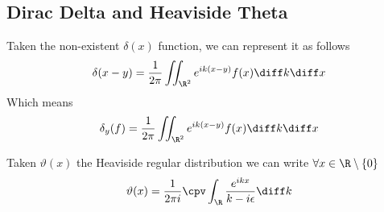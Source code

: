 \documentclass[../mmf.tex]{subfiles}
\begin{document}
\subsection{Dirac Delta and Heaviside Theta}
\begin{thm}
	Taken the non-existent $\delta(x)$ function, we can represent it as follows
	\begin{equation}
		\delta(x-y)=\frac{1}{2\pi}\iint_{\R^2}^{}e^{ik(x-y)}f(x)\diff k\diff x
		\label{eq:deltafunction}
	\end{equation}
	Which means
	\begin{equation*}
		\delta_y(f)=\frac{1}{2\pi}\iint_{\R^2}e^{ik(x-y)}f(x)\diff k\diff x
	\end{equation*}
\end{thm}
\begin{thm}
	Taken $\vartheta(x)$ the Heaviside regular distribution we can write $\forall x\in\R\setminus\{0\}$
	\begin{equation}
		\vartheta(x)=\frac{1}{2\pi i}\cpv\int_{\R}^{}\frac{e^{ikx}}{k-i\epsilon}\diff k
		\label{eq:varthetaintegral}
	\end{equation}
\end{thm}
\end{document}
